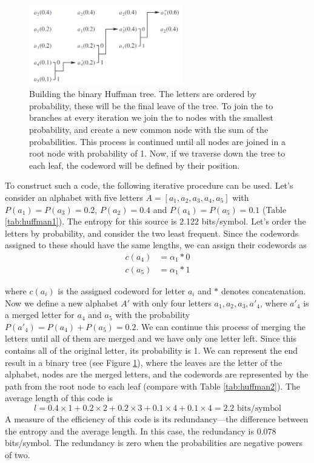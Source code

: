 \begin{figure}
\centering
\includegraphics[width=0.6\textwidth]{huffman}
\caption{Building the binary Huffman tree. The letters are ordered by probability, these will be the final leave of the tree. To join the to branches at every iteration we join the to nodes with the smallest probability, and create a new common node with the sum of the probabilities. This process is continued until all nodes are joined in a root node with probability of 1. Now, if we traverse down the tree to each leaf, the codeword will be defined by their position. }
\label{fig:huffman}
\end{figure}

To construct such a code, the following iterative procedure can be used. Let's consider an alphabet with five letters $A = [a_1,a_2,a_3,a_4,a_5]$ with $P(a_1)=P(a_3)=0.2$, $P(a_2)=0.4$ and $P(a_4)=P(a_5)=0.1$ (Table \ref{tab:huffman1}). The entropy for this source is 2.122 bits/symbol. Let's order the letters by probability, and consider the two least frequent. Since the codewords assigned to these should have the same lengths, we can assign their codewords as
\begin{align*}
c(a_4) &= \alpha_1 * 0 \\
c(a_5) &= \alpha_1 *1
\end{align*}

where $c(a_i)$ is the assigned codeword for letter $a_i$ and $*$ denotes concatenation. Now we define a new alphabet $A'$ with only four letters $a_1, a_2, a_3, a'_4$, where $a'_4$ is a merged letter for $a_4$ and $a_5$ with the probability $P(a'_4) = P(a_4) + P(a_5) = 0.2$. We can continue this process of merging the letters until all of them are merged and we have only one letter left. Since this contains all of the original letter, its probability is 1. We can represent the end result in a binary tree (see Figure \ref{fig:huffman}), where the leaves are the letter of the alphabet, nodes are the merged letters, and the codewords are represented by the path from the root node to each leaf (compare with Table \ref{tab:huffman2}). The average length of this code is
\begin{equation}
l = 0.4\times 1 + 0.2 \times 2 + 0.2 \times 3 + 0.1 \times 4 + 0.1 \times 4 = 2.2 \text{ bits/symbol}
\end{equation}
A measure of the efficiency of this code is its redundancy—the difference between the entropy
and the average length. In this case, the redundancy is 0.078 bits/symbol. The redundancy is
zero when the probabilities are negative powers of two.

